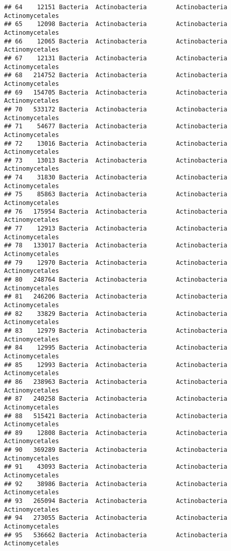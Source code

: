 \documentclass[
]{article}
\begin{document}
\begin{verbatim}
## 64    12151 Bacteria  Actinobacteria        Actinobacteria     Actinomycetales
## 65    12098 Bacteria  Actinobacteria        Actinobacteria     Actinomycetales
## 66    12065 Bacteria  Actinobacteria        Actinobacteria     Actinomycetales
## 67    12131 Bacteria  Actinobacteria        Actinobacteria     Actinomycetales
## 68   214752 Bacteria  Actinobacteria        Actinobacteria     Actinomycetales
## 69   154705 Bacteria  Actinobacteria        Actinobacteria     Actinomycetales
## 70   533172 Bacteria  Actinobacteria        Actinobacteria     Actinomycetales
## 71    54677 Bacteria  Actinobacteria        Actinobacteria     Actinomycetales
## 72    13016 Bacteria  Actinobacteria        Actinobacteria     Actinomycetales
## 73    13013 Bacteria  Actinobacteria        Actinobacteria     Actinomycetales
## 74    31830 Bacteria  Actinobacteria        Actinobacteria     Actinomycetales
## 75    85863 Bacteria  Actinobacteria        Actinobacteria     Actinomycetales
## 76   175954 Bacteria  Actinobacteria        Actinobacteria     Actinomycetales
## 77    12913 Bacteria  Actinobacteria        Actinobacteria     Actinomycetales
## 78   133017 Bacteria  Actinobacteria        Actinobacteria     Actinomycetales
## 79    12970 Bacteria  Actinobacteria        Actinobacteria     Actinomycetales
## 80   248764 Bacteria  Actinobacteria        Actinobacteria     Actinomycetales
## 81   246206 Bacteria  Actinobacteria        Actinobacteria     Actinomycetales
## 82    33829 Bacteria  Actinobacteria        Actinobacteria     Actinomycetales
## 83    12979 Bacteria  Actinobacteria        Actinobacteria     Actinomycetales
## 84    12995 Bacteria  Actinobacteria        Actinobacteria     Actinomycetales
## 85    12993 Bacteria  Actinobacteria        Actinobacteria     Actinomycetales
## 86   238963 Bacteria  Actinobacteria        Actinobacteria     Actinomycetales
## 87   240258 Bacteria  Actinobacteria        Actinobacteria     Actinomycetales
## 88   515421 Bacteria  Actinobacteria        Actinobacteria     Actinomycetales
## 89    12808 Bacteria  Actinobacteria        Actinobacteria     Actinomycetales
## 90   369289 Bacteria  Actinobacteria        Actinobacteria     Actinomycetales
## 91    43093 Bacteria  Actinobacteria        Actinobacteria     Actinomycetales
## 92    38986 Bacteria  Actinobacteria        Actinobacteria     Actinomycetales
## 93   265094 Bacteria  Actinobacteria        Actinobacteria     Actinomycetales
## 94   273055 Bacteria  Actinobacteria        Actinobacteria     Actinomycetales
## 95   536662 Bacteria  Actinobacteria        Actinobacteria     Actinomycetales

\end{verbatim}
\end{document}
